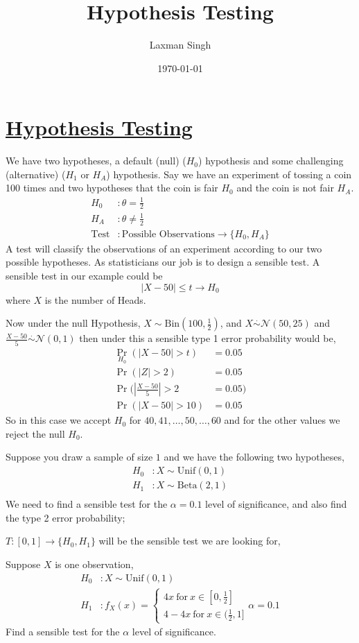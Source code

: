 \documentclass[12pt,a4paper]{article}
\author{Laxman Singh}
\date{\today}
\title{Hypothesis Testing}
\begin{document}
 \section*{\underline{Hypothesis Testing}}
We have two hypotheses, a default (null) (\(H_{0}\)) hypothesis and some challenging (alternative) (\(H_{1}\) or \(H_{A}\)) hypothesis.
Say we have an experiment of tossing a coin 100 times and two hypotheses that the coin is fair \(H_{0}\)  and the coin is not fair \(H_{A}\).  
\begin{align*}
    H_{0} & : \theta =\frac{1}{2}\\
    H_{A} & : \theta \neq \frac{1}{2}\\
    \text{Test} & : \text{Possible Observations} \to \{H_{0},H_{A}\}
\end{align*}
A test will classify the observations of an experiment according to our two possible hypotheses.
As statisticians our job is to design a sensible test.
A sensible test in our example could be \[|X - 50| \leq t \to H_{0}\]
where \(X\) is the number of Heads.  

Now under the null Hypothesis, \(X \sim \text{Bin}(100,\frac{1}{2}) \), and \(X \overset{\cdot}{\sim} \mathcal{N}(50,25)\) and \(\frac{X-50}{5} \overset{\cdot}{\sim} \mathcal{N}(0,1)\) then under this a sensible type 1 error probability would be,
\begin{align*}
    \Pr_{H_{0}}(|X-50| > t) &=0.05\\
    \Pr (|Z|>2) &= 0.05 \\
    \Pr \bigg( \left|\frac{X-50}{5}\right| > 2 &= 0.05\bigg) \\
    \Pr (|X-50| > 10) &= 0.05
\end{align*}  
So in this case we accept \(H_{0}\) for \(40,41,\ldots,50,\ldots,60\) and for the other values we reject the null \(H_{0}\).  
\pagebreak

Suppose you draw a sample of size \(1\) and we have the following two hypotheses,
\begin{align*}
    H_{0} &: X \sim \text{Unif}(0,1)\\
    H_{1} &: X \sim \text{Beta}(2,1)\\
\end{align*} 
We need to find a sensible test for the \(\alpha = 0.1\) level of significance, and also find the type 2 error probability; 

\(T : [0,1] \to \{H_{0},H_{1}\} \)  will be the sensible test we are looking for, 

Suppose \(X\) is one observation,
\begin{align*}
    H_{0} &: X \sim \text{Unif}(0,1)\\
    H_{1} &: f_{X}(x)=\begin{cases} 4x \ \text{for} \ x \in [0,\frac{1}{2}]\\
        4-4x  \ \text{for} \ x \in (\frac{1}{2},1] %
    \end{cases}
    \alpha = 0.1    
\end{align*} 
Find a sensible test for the \(\alpha \) level of significance.
\end{document}
